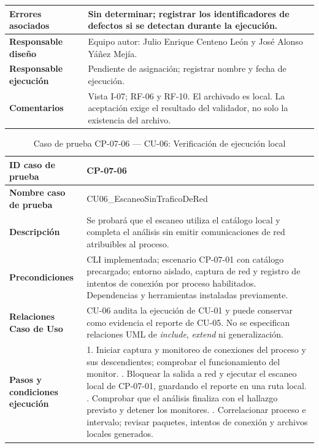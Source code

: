 \begin{table}[H]
\begin{tabularx}{\textwidth}{|P{4.15cm}|Y|}
\textbf{Errores asociados} & Sin determinar; registrar los identificadores de defectos si se detectan durante la ejecución. \\ \hline
\textbf{Responsable diseño} & Equipo autor: Julio Enrique Centeno León y José Alonso Yáñez Mejía. \\ \hline
\textbf{Responsable ejecución} & Pendiente de asignación; registrar nombre y fecha de ejecución. \\ \hline
\textbf{Comentarios} & Vista I-07; RF-06 y RF-10. El archivado es local. La aceptación exige el resultado del validador, no solo la existencia del archivo. \\ \hline
\end{tabularx}
\end{table}
\clearpage
\begin{table}[H]
\centering\small{}
\renewcommand{\arraystretch}{1.15}
\caption{Caso de prueba CP-07-06 --- CU-06: Verificación de ejecución local}
\label{p7:tab:cp07_06}
\begin{tabularx}{\textwidth}{|P{4.15cm}|Y|}
\hline
\textbf{ID caso de prueba} & CP-07-06 \\ \hline
\textbf{Nombre caso de prueba} & CU06\_\allowbreak EscaneoSinTraficoDeRed \\ \hline
\textbf{Descripción} & Se probará que el escaneo utiliza el catálogo local y completa el análisis sin emitir comunicaciones de red atribuibles al proceso. \\ \hline
\textbf{Precondiciones} & CLI implementada; escenario CP-07-01 con catálogo precargado; entorno aislado, captura de red y registro de intentos de conexión por proceso habilitados. Dependencias y herramientas instaladas previamente. \\ \hline
\textbf{Relaciones Caso de Uso} & CU-06 audita la ejecución de CU-01 y puede conservar como evidencia el reporte de CU-05. No se especifican relaciones UML de \textit{include}, \textit{extend} ni generalización. \\ \hline
\textbf{Pasos y condiciones ejecución} & 1. Iniciar captura y monitoreo de conexiones del proceso y sus descendientes; comprobar el funcionamiento del monitor. . Bloquear la salida a red y ejecutar el escaneo local de CP-07-01, guardando el reporte en una ruta local. . Comprobar que el análisis finaliza con el hallazgo previsto y detener los monitores. . Correlacionar proceso e intervalo; revisar paquetes, intentos de conexión y archivos locales generados. \\ \hline

\end{tabularx}
\end{table}
